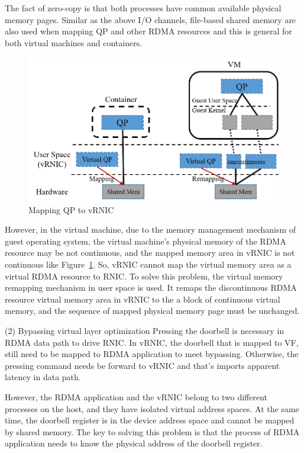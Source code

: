 The fact of zero-copy is that both processes have common available physical memory pages. Similar as the above I/O channels, file-based shared memory are also used when mapping QP and other RDMA resources and this is general for both virtual machines and containers.

\begin{figure}[!ht]
	\centering
	\includegraphics[width=1.0\linewidth]{images/zero-copy}
	\caption{Mapping QP to vRNIC}
	\label{fig:zero-copy}
\end{figure}

However, in the virtual machine, due to the memory management mechanism of guest operating system, the virtual machine's physical memory of the RDMA resource may be not continuous, and the mapped memory area in vRNIC is not continuous like Figure~\ref{fig:zero-copy}. So, vRNIC cannot map the virtual memory area as a virtual RDMA resource to RNIC. To solve this problem, the virtual memory remapping mechanism in user space is used. It remaps the discontinuous RDMA resource virtual memory area in vRNIC to the a block of continuous virtual memory, and the sequence of mapped physical memory page must be unchanged.

(2) Bypassing virtual layer optimization
Pressing the doorbell is necessary in RDMA data path to drive RNIC. In vRNIC, the doorbell that is mapped to VF, still need to be mapped to RDMA application to meet bypassing. Otherwise, the pressing command needs be forward to vRNIC and that’s imports apparent latency in data path.

However, the RDMA application and the vRNIC belong to two different processes on the host, and they have isolated virtual address spaces. At the same time, the doorbell register is in the device address space and cannot be mapped by shared memory. The key to solving this problem is that the process of RDMA application needs to know the physical address of the doorbell register.


